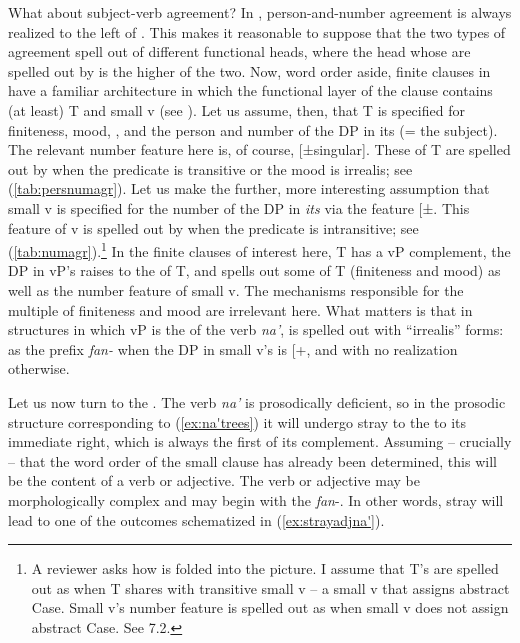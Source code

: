 \documentclass[output=paper,
modfonts
]{LSP/langsci}
\begin{document}
\begin{exe}
\begin{xlist}
What about subject-verb agreement? In , person-and-number
agreement is always realized to the left of . This makes
it reasonable to suppose that the two types of agreement spell out
 of different functional heads, where the head whose 
are spelled out by  is the higher of the two.
Now, word order aside, finite clauses in  have a familiar
architecture in which the functional layer of the clause contains (at
least) T and small v (see \citealt{chung1998,chung2004}). Let us assume, then,
that T is specified for finiteness, mood, , and the person and
number of the DP in its  (= the subject). The relevant number
feature here is, of course, {[}±singular{]}. These  of T are
spelled out by  when the predicate is
transitive or the mood is irrealis; see (\ref{tab:persnumagr}). Let us make the further,
more interesting assumption that small v is specified for the number of
the DP in \emph{its}  via the feature {[}±\isi{plural}{]}. This
feature of v is spelled out by  when the predicate is
intransitive; see (\ref{tab:numagr}).\footnote{A reviewer asks how  is
  folded into the picture. I assume that T's  are spelled out as
   when T shares  with transitive
  small v -- a small v that assigns abstract Case. Small v's number
  feature is spelled out as  when small v does not
  assign abstract Case. See 7.2.} In the finite clauses of interest
here, T has a vP complement, the DP in vP's  raises to the
 of T, and  spells out some  of T
(finiteness and mood) as well as the number feature of small v. The
mechanisms responsible for the multiple  of finiteness and mood
are irrelevant here. What matters is that in structures in which vP is
the  of the verb \emph{na'},  is spelled out
with ``irrealis'' forms: as the prefix \emph{fan-} when the DP in small
v's  is {[}+\isi{plural}{]}, and with no realization otherwise.

Let us now turn to the . The verb \emph{na'} is prosodically
deficient, so in the prosodic structure corresponding to (\ref{ex:na'trees}) it will
undergo stray  to the  to its immediate
right, which is always the first  of its complement.
Assuming -- crucially -- that the word order of the small clause
 has already been determined, this  will be
the content of a verb or adjective. The verb or adjective may be
morphologically complex and may begin with the  \emph{fan}-. In
other words, stray  will lead to one of the outcomes
schematized in (\ref{ex:strayadjna'}).


\end{xlist}
\end{exe}
\end{document}
